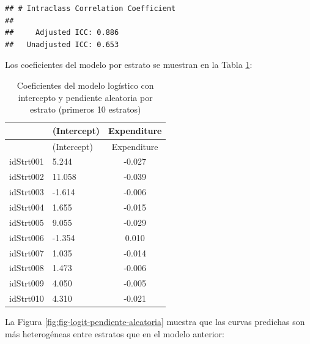 \documentclass[
  spanish,
  12pt,
]{book}
\newenvironment{Shaded}{\begin{snugshade}}{\end{snugshade}}
\newcommand{\DataTypeTok}[1]{\textcolor[rgb]{0.13,0.29,0.53}{#1}}
\newcommand{\DecValTok}[1]{\textcolor[rgb]{0.00,0.00,0.81}{#1}}
\newcommand{\FunctionTok}[1]{\textcolor[rgb]{0.13,0.29,0.53}{\textbf{#1}}}
\newcommand{\NormalTok}[1]{#1}
\newcommand{\SpecialCharTok}[1]{\textcolor[rgb]{0.81,0.36,0.00}{\textbf{#1}}}
\begin{document}
\begin{verbatim}
## # Intraclass Correlation Coefficient
## 
##     Adjusted ICC: 0.886
##   Unadjusted ICC: 0.653
\end{verbatim}

Los coeficientes del modelo por estrato se muestran en la Tabla \ref{tab:tab-coef-logit-pendiente}:

\begin{Shaded}
\end{Shaded}

\begin{longtable}[]{@{}llc@{}}
\caption{\label{tab:tab-coef-logit-pendiente}Coeficientes del modelo logístico con intercepto y pendiente aleatoria por estrato (primeros 10 estratos)}\tabularnewline
\toprule\noalign{}
& (Intercept) & Expenditure \\
\midrule\noalign{}
\endfirsthead
\toprule\noalign{}
& (Intercept) & Expenditure \\
\midrule\noalign{}
\endhead
\bottomrule\noalign{}
\endlastfoot
idStrt001 & 5.244 & -0.027 \\
idStrt002 & 11.058 & -0.039 \\
idStrt003 & -1.614 & -0.006 \\
idStrt004 & 1.655 & -0.015 \\
idStrt005 & 9.055 & -0.029 \\
idStrt006 & -1.354 & 0.010 \\
idStrt007 & 1.035 & -0.014 \\
idStrt008 & 1.473 & -0.006 \\
idStrt009 & 4.050 & -0.005 \\
idStrt010 & 4.310 & -0.021 \\
\end{longtable}

La Figura \ref{fig:fig-logit-pendiente-aleatoria} muestra que las curvas predichas son más heterogéneas entre estratos que en el modelo anterior:
\end{document}

